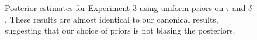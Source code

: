 \documentclass[doc,biblatex,floatsintext]{apa7}
\begin{document}
\clearpage

\begin{figure}
\vspace*{2pt}
\caption{Posterior estimates for Experiment 3 using uniform priors on $\tau$ and $\delta$. These results are almost identical to our canonical results, suggesting that our choice of priors is not biasing the posteriors.}
\label{supp5}
\end{figure}

\clearpage
\end{document}
